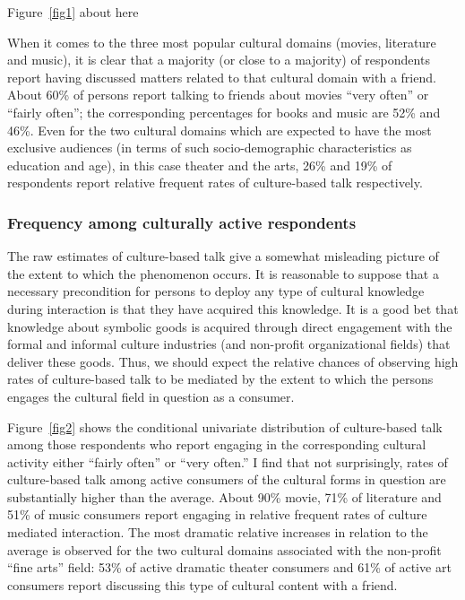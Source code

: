 \documentclass[11pt]{article}
\begin{document}
\begin{center}
	Figure~\ref{fig1} about here
\end{center}
 
When it comes to the three most popular cultural domains  (movies, literature and music), it is clear that a majority (or close to a majority) of respondents report having discussed matters related to that cultural domain with a friend.  About 60\% of persons report talking to friends about movies ``very often'' or ``fairly often''; the corresponding percentages for books and music are 52\% and 46\%. Even for the two cultural domains which are expected to have the most exclusive audiences (in terms of such socio-demographic characteristics as education and age), in this case theater and the arts, 26\% and 19\% of respondents report relative frequent rates of culture-based talk respectively. 
 
\subsubsection{Frequency among culturally active respondents}
The raw estimates of culture-based talk give a somewhat misleading picture of the extent to which the phenomenon occurs. It is reasonable to suppose that a necessary precondition for persons to deploy any type of cultural knowledge during interaction is that they have acquired this knowledge.  It is a good bet that knowledge about symbolic goods is acquired through direct engagement with the formal and informal culture industries (and non-profit organizational fields) that deliver these goods.  Thus, we should expect the relative chances of observing high rates of culture-based talk to be mediated by the extent to which the persons engages the cultural field in question as a consumer.
 
Figure~\ref{fig2} shows the conditional univariate distribution of culture-based talk among those respondents who report engaging in the corresponding cultural activity either ``fairly often'' or ``very often.''  I find that not surprisingly, rates of culture-based talk among active consumers of the cultural forms in question are substantially higher than the average.  About 90\% movie, 71\% of literature and 51\% of music consumers report engaging in relative frequent rates of culture mediated interaction.  The most dramatic relative increases in relation to the average is observed for the two cultural domains associated with the non-profit ``fine arts'' field:  53\% of active dramatic theater consumers and 61\% of active art consumers report discussing this type of cultural content with a friend.  
\end{document}
